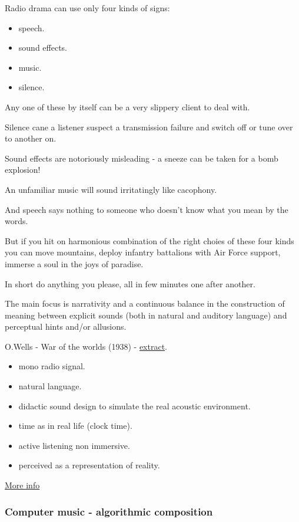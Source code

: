 Radio drama can use only four kinds of signs:

\begin{itemize}
\tightlist
\item speech.
\item sound effects.
\item music.
\item silence.
\end{itemize}

Any one of these by itself can be a very slippery client to deal with.

Silence cane a listener suspect a transmission failure and switch off or tune over to another on.

Sound effects are notoriously misleading - a sneeze can be taken for a bomb explosion!

An unfamiliar music will sound irritatingly like cacophony.

And speech says nothing to someone who doesn't know what you mean by the words.

But if you hit on harmonious combination of the right choies of these four kinds you can move mountains, deploy infantry battalions with Air Force support, immerse a soul in the joys of paradise.

In short do anything you please, all in few minutes one after another.

The main focus is narrativity and a continuous balance in the construction of meaning between explicit sounds (both in natural and auditory language) and perceptual hints and/or allusions.

O.Wells - War of the worlds (1938) - \href{https://github.com/musicaecodice/EMC/blob/main/2_instruments/suoni/wells.mp3}{extract}.

\begin{itemize}
\tightlist
\item mono radio signal.
\item natural language.
\item didactic sound design to simulate the real acoustic environment.
\item time as in real life (clock time).
\item active listening non immersive.
\item perceived as a representation of reality.
\end{itemize}

\href{img/radio.pdf}{More info}

\subsubsection{Computer music - algorithmic composition}\label{computer-music---algorithmic-composition}

